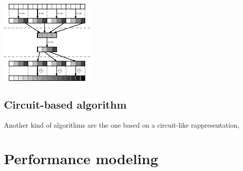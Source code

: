 \documentclass{article}
\begin{document}
\begin{center}
\begin{minipage}{0.75\linewidth}
\includegraphics[width=\linewidth]{img/block}
\end{minipage}
\end{center}


\subsection{Circuit-based algorithm}

Another kind of algorithms are the one based on a circuit-like rappresentation, 

\section{Performance modeling}
\end{document}
